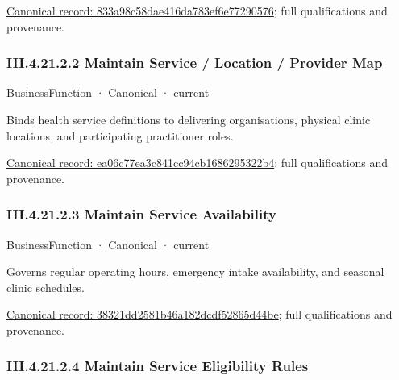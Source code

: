{\footnotesize \href{../../../../continuum/business/business-function/833a98c58dae416da783ef6e77290576.md}{Canonical record: 833a98c58dae416da783ef6e77290576}; full qualifications and provenance.}\par
\subsubsection*{III.4.21.2.2 Maintain Service / Location / Provider Map}
\label{navigation:III.4.21.2.2}

\label{element:ea06c77ea3c841cc94cb1686295322b4}
{\small BusinessFunction · Canonical · current}\par

Binds health service definitions to delivering organisations, physical clinic locations, and participating practitioner roles.


{\footnotesize \href{../../../../continuum/business/business-function/ea06c77ea3c841cc94cb1686295322b4.md}{Canonical record: ea06c77ea3c841cc94cb1686295322b4}; full qualifications and provenance.}\par
\subsubsection*{III.4.21.2.3 Maintain Service Availability}
\label{navigation:III.4.21.2.3}

\label{element:38321dd2581b46a182dcdf52865d44be}
{\small BusinessFunction · Canonical · current}\par

Governs regular operating hours, emergency intake availability, and seasonal clinic schedules.


{\footnotesize \href{../../../../continuum/business/business-function/38321dd2581b46a182dcdf52865d44be.md}{Canonical record: 38321dd2581b46a182dcdf52865d44be}; full qualifications and provenance.}\par
\subsubsection*{III.4.21.2.4 Maintain Service Eligibility Rules}
\label{navigation:III.4.21.2.4}

